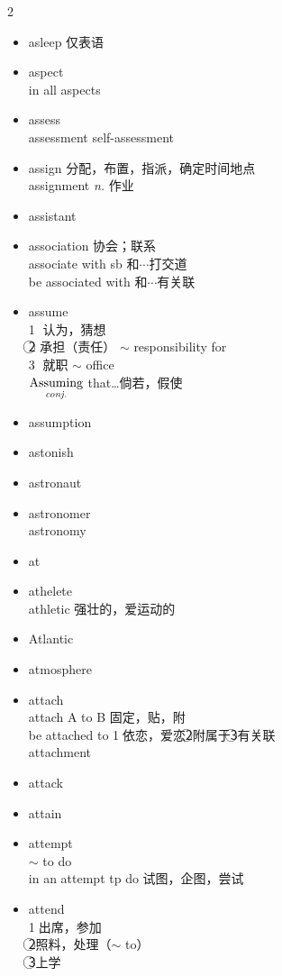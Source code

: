 \documentclass[../../book.tex]{subfiles}
\begin{document}
\begin{multicols}{2}
\begin{itemize}
\item[-] asleep 仅表语
\item[-] aspect
\\in all aspects
\item[-] assess
\\assessment self-assessment
\item[-] assign 分配，布置，指派，确定时间地点
\\assignment \emph{n.} 作业
\item[-] assistant
\item[-] association 协会；联系
\\associate with sb 和$\cdots$打交道
\\be associated with 和$\cdots$有关联
\item[-] assume
\\\textcircled{1} 认为，猜想
\\\textcircled{2} 承担（责任） $\sim$ responsibility for
\\\textcircled{3} 就职 $\sim$ office
\\$\underset{\text{\emph{conj.}}}{\text{Assuming}}$ that\ldots 倘若，假使
\item[-] assumption
\item[-] astonish
\item[-] astronaut
\item[-] astronomer
\\astronomy
\item[-] at
\item[-] athelete
\\athletic 强壮的，爱运动的
\item[-] Atlantic
\item[-] atmosphere
\item[-] attach
\\attach A to B 固定，贴，附
\\be attached to \textcircled{1}依恋，爱恋\textcircled{2}附属于\textcircled{3}有关联
\\attachment
\item[-] attack
\item[-] attain
\item[-] attempt
\\$\sim$ to do
\\in an attempt tp do 试图，企图，尝试
\item[-] attend
\\\textcircled{1}出席，参加
\\\textcircled{2}照料，处理（$\sim$ to）
\\\textcircled{3}上学

\end{itemize}
\end{multicols}
\end{document}

